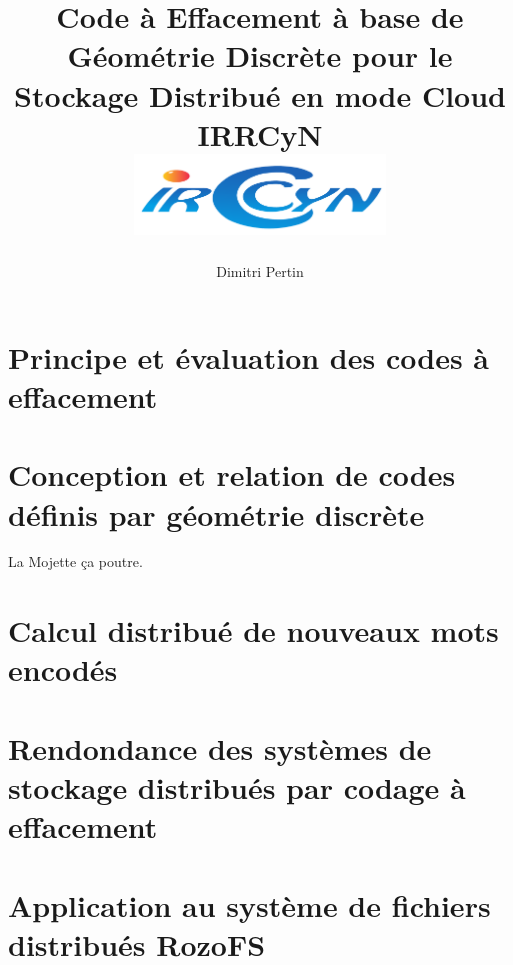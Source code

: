 
\makeindex



\title{
    {Code à Effacement à base de Géométrie Discrète pour le Stockage
    Distribué en mode Cloud}\\
    {\large IRRCyN}\\
    {\includegraphics[width=0.5\textwidth]{img/logo_irccyn.pdf}}
}
\author{Dimitri Pertin}
\date {}

\maketitle

\newpage

\tableofcontents

\chapter{Principe et évaluation des codes à effacement}



\chapter{Conception et relation de codes définis par géométrie discrète}

La Mojette ça poutre.



\chapter{Calcul distribué de nouveaux mots encodés}



\chapter{Rendondance des systèmes de stockage distribués par codage à
effacement}



\chapter{Application au système de fichiers distribués RozoFS}



\newpage

\printbibliography[
]

\printindex


